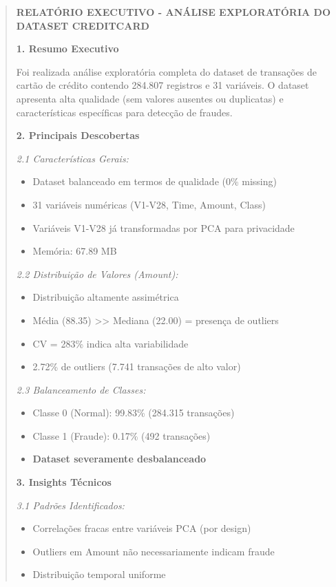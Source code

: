 \documentclass[12pt,a4paper]{article}
\begin{document}
\begin{quote}
\textbf{RELATÓRIO EXECUTIVO - ANÁLISE EXPLORATÓRIA DO DATASET CREDITCARD}

\textbf{1. Resumo Executivo}

Foi realizada análise exploratória completa do dataset de transações de cartão de crédito contendo 284.807 registros e 31 variáveis. O dataset apresenta alta qualidade (sem valores ausentes ou duplicatas) e características específicas para detecção de fraudes.

\textbf{2. Principais Descobertas}

\textit{2.1 Características Gerais:}
\begin{itemize}
    \item Dataset balanceado em termos de qualidade (0\% missing)
    \item 31 variáveis numéricas (V1-V28, Time, Amount, Class)
    \item Variáveis V1-V28 já transformadas por PCA para privacidade
    \item Memória: 67.89 MB
\end{itemize}

\textit{2.2 Distribuição de Valores (Amount):}
\begin{itemize}
    \item Distribuição altamente assimétrica
    \item Média (88.35) >> Mediana (22.00) = presença de outliers
    \item CV = 283\% indica alta variabilidade
    \item 2.72\% de outliers (7.741 transações de alto valor)
\end{itemize}

\textit{2.3 Balanceamento de Classes:}
\begin{itemize}
    \item Classe 0 (Normal): 99.83\% (284.315 transações)
    \item Classe 1 (Fraude): 0.17\% (492 transações)
    \item \textbf{Dataset severamente desbalanceado}
\end{itemize}

\textbf{3. Insights Técnicos}

\textit{3.1 Padrões Identificados:}
\begin{itemize}
    \item Correlações fracas entre variáveis PCA (por design)
    \item Outliers em Amount não necessariamente indicam fraude
    \item Distribuição temporal uniforme
\end{itemize}


\end{quote}
\end{document}
